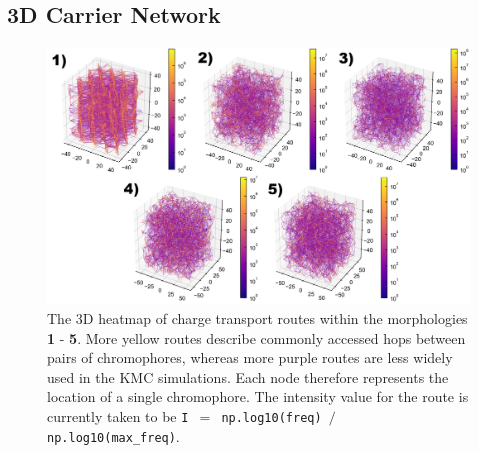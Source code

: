 \documentclass[12pt]{article}
\begin{document}
\subsection{3D Carrier Network}

\begin{figure}[h!]\centering
	\includegraphics[width=\textwidth]{Figures/3dHole.png}
    \caption{The 3D heatmap of charge transport routes within the morphologies \textbf{1} - \textbf{5}.
    More yellow routes describe commonly accessed hops between pairs of chromophores, whereas more purple routes are less widely used in the KMC simulations.
    Each node therefore represents the location of a single chromophore.
The intensity value for the route is currently taken to be \texttt{I $=$ np.log10(freq) $/$ np.log10(max\_freq)}.}
	\label{fig:3dNetwork}
\end{figure}
\end{document}
